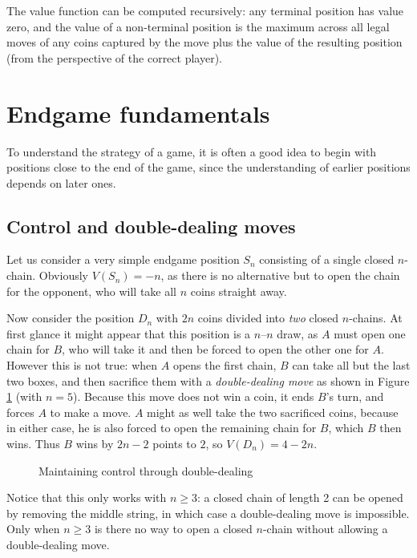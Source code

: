 \documentclass[a4paper,twocolumn]{article}
\begin{document}
The value function can be computed recursively: any terminal position
has value zero, and the value of a non-terminal position is the
maximum across all legal moves of any coins captured by the move plus
the value of the resulting position (from the perspective of the
correct player).

\section{Endgame fundamentals}\label{endgamesection}

To understand the strategy of a game, it is often a good idea to begin
with positions close to the end of the game, since the understanding
of earlier positions depends on later ones.

\subsection{Control and double-dealing moves}

Let us consider a very simple endgame position $S_n$ consisting of a
single closed $n$-chain. Obviously $V(S_n)=-n$, as there is no
alternative but to open the chain for the opponent, who will take all
$n$ coins straight away.

Now consider the position $D_n$ with $2n$ coins divided into
\emph{two} closed $n$-chains. At first glance it might appear that
this position is a $n$--$n$ draw, as $A$ must open one chain for $B$,
who will take it and then be forced to open the other one for
$A$. However this is not true: when $A$ opens the first chain, $B$ can
take all but the last two boxes, and then sacrifice them with a
\emph{double-dealing move} as shown in Figure \ref{dddemo} (with
$n=5$). Because this move does not win a coin, it ends $B$'s turn, and
forces $A$ to make a move. $A$ might as well take the two sacrificed
coins, because in either case, he is also forced to open the remaining
chain for $B$, which $B$ then wins. Thus $B$ wins by $2n - 2$ points
to $2$, so $V(D_n) = 4-2n$.

\begin{figure}
  \centering
  \def\svgscale{0.7}
  
  \caption{Maintaining control through double-dealing}
  \label{dddemo}
\end{figure}

Notice that this only works with $n \ge 3$: a closed chain of length 2
can be opened by removing the middle string, in which case a
double-dealing move is impossible. Only when $n \ge 3$ is there no way
to open a closed $n$-chain without allowing a double-dealing move.
\end{document}
